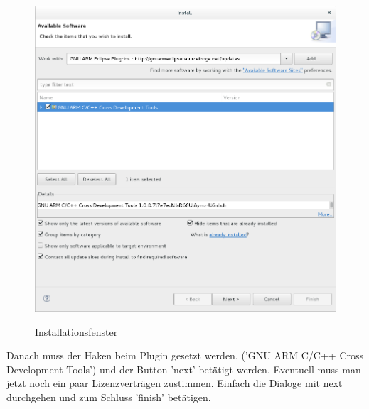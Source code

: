 \documentclass[12pt,a4paper]{article}
\begin{document}
\begin{figure}[h]
\begin{center}
\includegraphics[width=12cm]{grafiken/debugger/GNUauswahl.png}
\label{eclipse_gnu_auswahl}
\caption{Installationsfenster}
\end{center}
\end{figure}
Danach muss der Haken beim Plugin gesetzt werden, ('GNU ARM C/C++ Cross Development Tools') und der Button 'next' betätigt werden. Eventuell muss man jetzt noch ein paar Lizenzverträgen zustimmen. Einfach die Dialoge mit next durchgehen und zum Schluss 'finish' betätigen.
\end{document}
